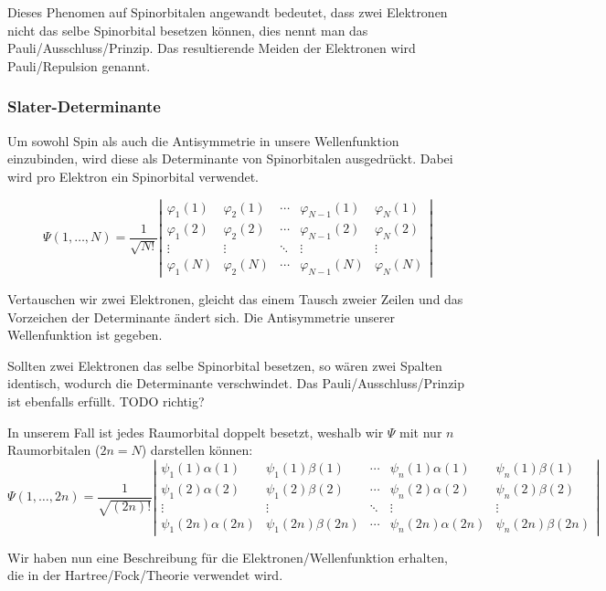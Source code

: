 Dieses Phenomen auf Spinorbitalen angewandt bedeutet,
dass zwei Elektronen nicht das selbe Spinorbital besetzen können,
dies nennt man das Pauli\-/Ausschluss\-/Prinzip.
Das resultierende Meiden der Elektronen wird Pauli\-/Repulsion genannt.

\cite[S. 271, 276]{levine_2019}

\subsubsection*{Slater-Determinante}
Um sowohl Spin als auch die Antisymmetrie in unsere Wellenfunktion einzubinden,
wird diese als Determinante von Spinorbitalen ausgedrückt.
Dabei wird pro Elektron ein Spinorbital verwendet.

\begin{equation}\label{slater}
\Psi(1, \dots, N) = 
\frac{1}{\sqrt{N!}}
\left\lvert
\begin{array}{ccccc} 
\varphi_1(1)  & \varphi_2(1)  & \cdots & \varphi_{N-1}(1)  & \varphi_N(1)\\ 
\varphi_1(2)  & \varphi_2(2)  & \cdots & \varphi_{N-1}(2)  & \varphi_N(2)\\ 
\vdots        & \vdots        & \ddots & \vdots            & \vdots      \\ 
\varphi_1(N)  & \varphi_2(N)  & \cdots & \varphi_{N-1}(N)  & \varphi_N(N)
\end{array}
\right\rvert
\end{equation}

Vertauschen wir zwei Elektronen, gleicht das einem Tausch zweier Zeilen
und das Vorzeichen der Determinante ändert sich.
Die Antisymmetrie unserer Wellenfunktion ist gegeben.

Sollten zwei Elektronen das selbe Spinorbital besetzen,
so wären zwei Spalten identisch, wodurch die Determinante verschwindet.
Das Pauli\-/Ausschluss\-/Prinzip ist ebenfalls erfüllt. TODO richtig?

\cite[S. 50]{szabo_ostlund_1996}

In unserem Fall ist jedes Raumorbital doppelt besetzt,
weshalb wir $\Psi$ mit nur $n$ Raumorbitalen ($2n = N$) darstellen können:
\begin{equation}
\Psi(1, \dots, 2n) = 
\frac{1}{\sqrt{(2n)!}}
\left\lvert
\begin{array}{ccccc} 
\psi_1(1)\alpha(1) & \psi_1(1)\beta(1) & \cdots & \psi_n(1)\alpha(1) & \psi_n(1)\beta(1)\\ 
\psi_1(2)\alpha(2) & \psi_1(2)\beta(2) & \cdots & \psi_n(2)\alpha(2) & \psi_n(2)\beta(2)\\ 
    \vdots         &       \vdots      & \ddots &       \vdots       &       \vdots     \\ 
\psi_1(2n)\alpha(2n) & \psi_1(2n)\beta(2n) & \cdots & \psi_n(2n)\alpha(2n) & \psi_n(2n) \beta(2n)
\end{array}
\right\rvert
\end{equation}
\cite[S. 202]{lewars_2016}

Wir haben nun eine Beschreibung für die Elektronen\-/Wellenfunktion erhalten,
die in der Hartree\-/Fock\-/Theorie verwendet wird.